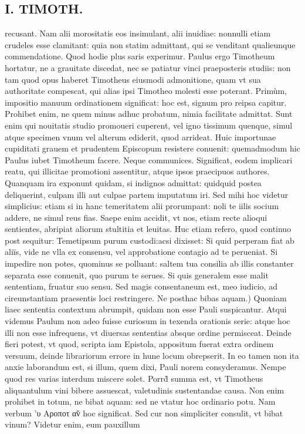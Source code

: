 \documentclass{article}
\begin{document}
\begin{pages}
\section*{I. TIMOTH. }
\marginpar{[ p.70 ]}\pstart recusant. Nam alii morositatis eos insimulant, alii inuidiae: nonnulli etiam crudeles esse clamitant: quia non statim admittant, qui se venditant qualieunque commendatione. Quod hodie plus saris experimur. Paulus ergo Timotheum hortatur, ne a grauitate discedat, nec se patiatur vinci praeposteris studiis: non tam quod opus haberet Timotheus eiusmodi admonitione, quam vt sua authoritate compescat, qui alias ipsi Timotheo molesti esse poterant. Primùm, impositio manuum ordinationem significat: hoc est, signum pro reipsa capitur. Prohibet enim, ne quem minus adhuc probatum, nimia facilitate admittat. Sunt enim qui nouitatis studio promoueri cuperent, vel igno tissimum quenque, simul atque specimen vnum vel alterum ediderit, quod arrideat. Huic importunae cupiditati grauem et prudentem Episcopum resistere conuenit: quemadmodum hic Paulus iubet Timotheum facere.  \pend\pstart Neque communices. Significat, eodem implicari reatu, qui illicitae promotioni assentitur, atque ipsos praecipuos authores. Quanquam ira exponunt quidam, si indignos admittat: quidquid postea deliquerint, culpam illi aut culpae partem imputatum iri. Sed mihi hoc videtur simplicius: etiam si in hanc temeritatem alii prorumpant: noli te iilis socium addere, ne simul reus fias. Saepe enim accidit, vt nos, etiam recte alioqui sentientes, abripiat aliorum stultitia et leuitas. Huc etiam refero, quod continuo post sequitur: Temetipsum purum custodi:acsi dixisset: Si quid perperam fiat ab aliïs, vide ne vlla ex consensu, vel approbatione contagio ad te perueniat. Si impedire non potes, quominus se polluant: saltem tua consilia ab illis constanter separata esse conuenit, quo purum te serues. Si quis generalem esse malit sententiam, fruatur suo sensu. Sed magis consentaneum est, meo iudicio, ad cireunstantiam praesentis loci restringere.  \pend\pstart Ne posthac bibas aquam.) Quoniam liaec sententia contextum abrumpit, quidam non esse Pauli suspicantur. Atqui videmus Paulum non adeo fuisse curiosum in texenda orationis serie: atque hoc illi non esse infrequens, vt diuersas sententias absque ordine permisceat. Deinde fieri potest, vt quod, scripta iam Epistola, appositum fuerat extra ordinem versuum, deinde librariorum errore in hune locum obrepserit. In eo tamen non ita anxie laborandum est, si illum, quem dixi, Pauli norem consyderamus. Nempe quod res varias interdum miscere solet. Porrd̀ summa est, vt Timotheus aliquantulum vini bibere assuescat, valetudinis sustentandae causa. Non enim prohibet in totum, ne bibat aquam: sed ne vtatur hoc ordinario potu. Nam verbum 'υ Αροποτ α̃ν hoc significat. Sed cur non simpliciter consulit, vt bibat vinum? Videtur enim, eum pauxillum  \pend

\end{pages}
\end{document}

